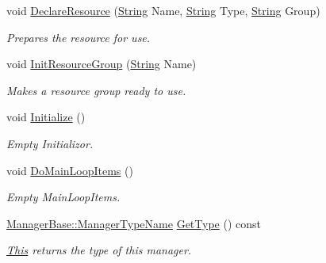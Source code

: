 \begin{DoxyCompactItemize}
void \hyperlink{classphys_1_1ResourceManager_abdb95affe5556ff2ff9aa312e740e584}{DeclareResource} (\hyperlink{namespacephys_aa03900411993de7fbfec4789bc1d392e}{String} Name, \hyperlink{namespacephys_aa03900411993de7fbfec4789bc1d392e}{String} Type, \hyperlink{namespacephys_aa03900411993de7fbfec4789bc1d392e}{String} Group)
\begin{DoxyCompactList}\small\item\em Prepares the resource for use. \item\end{DoxyCompactList}\item 
void \hyperlink{classphys_1_1ResourceManager_add022c243265fa397d91da3b3cbcce88}{InitResourceGroup} (\hyperlink{namespacephys_aa03900411993de7fbfec4789bc1d392e}{String} Name)
\begin{DoxyCompactList}\small\item\em Makes a resource group ready to use. \item\end{DoxyCompactList}\item 
void \hyperlink{classphys_1_1ResourceManager_a9be3250f1f1153c9e079f82736eb00a8}{Initialize} ()
\begin{DoxyCompactList}\small\item\em Empty Initializor. \item\end{DoxyCompactList}\item 
void \hyperlink{classphys_1_1ResourceManager_a2114714999441c095bc28d3673c2490e}{DoMainLoopItems} ()
\begin{DoxyCompactList}\small\item\em Empty MainLoopItems. \item\end{DoxyCompactList}\item 
\hyperlink{classphys_1_1ManagerBase_aaa6ccddf23892eaccb898529414f80a5}{ManagerBase::ManagerTypeName} \hyperlink{classphys_1_1ResourceManager_a9e5468e5428f5c108c7b3c01e94eba46}{GetType} () const 
\begin{DoxyCompactList}\small\item\em \hyperlink{structThis}{This} returns the type of this manager. \item\end{DoxyCompactList}\end{DoxyCompactItemize}
